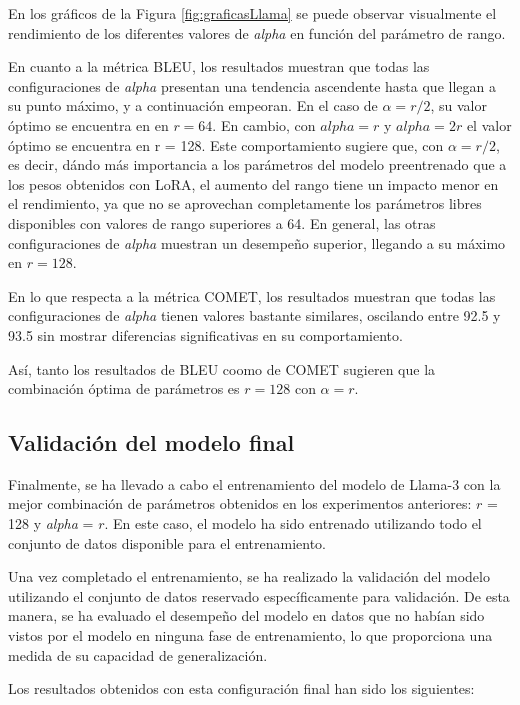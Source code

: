 \documentclass[11pt,spanish,listoffigures,listoftables]{tfgetsinf}
\begin{document}
En los gráficos de la Figura \ref{fig:graficasLlama} se puede observar visualmente el rendimiento de los diferentes valores de \textit{alpha} en función del parámetro de rango.

En cuanto a la métrica BLEU, los resultados muestran que todas las configuraciones de \textit{alpha} presentan una tendencia ascendente hasta que llegan a su punto máximo, y a continuación empeoran. En el caso de $\alpha = r/2$, su valor óptimo se encuentra en en $r = 64$. En cambio, con $alpha = r$ y $alpha = 2r$ el valor óptimo se encuentra en r = 128. Este comportamiento sugiere que, con $\alpha = r/2$, es decir, dándo más importancia a los parámetros del modelo preentrenado que a los pesos obtenidos con LoRA, el aumento del rango tiene un impacto menor en el rendimiento, ya que no se aprovechan completamente los parámetros libres disponibles con valores de rango superiores a 64. En general, las otras configuraciones de \textit{alpha} muestran un desempeño superior, llegando a su máximo en $r = 128$.

En lo que respecta a la métrica COMET, los resultados muestran que todas las configuraciones de \textit{alpha} tienen valores bastante similares, oscilando entre 92.5 y 93.5 sin mostrar diferencias significativas en su comportamiento.

Así, tanto los resultados de BLEU coomo de COMET sugieren que la combinación óptima de parámetros es $r = 128$ con $\alpha = r$.

\subsection{Validación del modelo final}

Finalmente, se ha llevado a cabo el entrenamiento del modelo de Llama-3 con la mejor combinación de parámetros obtenidos en los experimentos anteriores: $r$ = 128 y \textit{alpha} = $r$. En este caso, el modelo ha sido entrenado utilizando todo el conjunto de datos disponible para el entrenamiento.

Una vez completado el entrenamiento, se ha realizado la validación del modelo utilizando el conjunto de datos reservado específicamente para validación. De esta manera, se ha evaluado el desempeño del modelo en datos que no habían sido vistos por el modelo en ninguna fase de entrenamiento, lo que proporciona una medida de su capacidad de generalización.

Los resultados obtenidos con esta configuración final han sido los siguientes:
\end{document}
